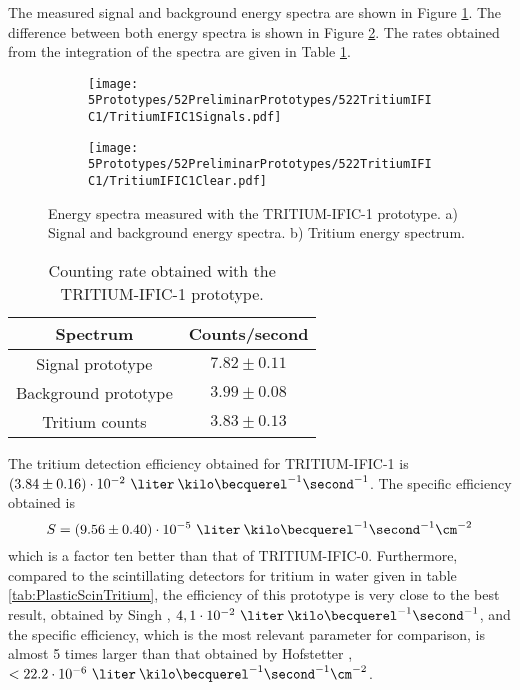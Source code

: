 The measured signal and background energy spectra are shown in Figure \ref{subfig:SignalBackgroundEnergySpectraTritiumIFIC1}. The difference between both energy spectra is shown in Figure \ref{subfig:TritiumEnergySpectraTritiumIFIC1}. The rates obtained from the integration of the spectra are given in Table \ref{tab:CountsPerSecondTRITIUMIFIC1}. 

\begin{figure}
\centering
    \begin{subfigure}[b]{1\textwidth}
    \centering
    \texttt{[image: 5Prototypes/52PreliminarPrototypes/522TritiumIFIC1/TritiumIFIC1Signals.pdf]}  
    \caption{\label{subfig:SignalBackgroundEnergySpectraTritiumIFIC1}}
    \end{subfigure}
    \hfill
    \begin{subfigure}[b]{1\textwidth}
    \centering
    \texttt{[image: 5Prototypes/52PreliminarPrototypes/522TritiumIFIC1/TritiumIFIC1Clear.pdf]}  
    \caption{\label{subfig:TritiumEnergySpectraTritiumIFIC1}}
    \end{subfigure}
 \caption{Energy spectra measured with the TRITIUM-IFIC-1 prototype. a) Signal and background energy spectra. b) Tritium energy spectrum.}
 \label{fig:EnergySpectraTRITIUMIFIC1}
\end{figure}

\begin{table}[htbp]
\centering{}%
\begin{tabular}{cc}
\toprule 
Spectrum & Counts/second \tabularnewline
\midrule
\midrule 
Signal prototype & $7.82 \pm 0.11$ \tabularnewline
Background prototype & $3.99 \pm 0.08$ \tabularnewline  
Tritium counts & $3.83 \pm 0.13$ \tabularnewline
\bottomrule
\end{tabular}
\caption{Counting rate obtained with the TRITIUM-IFIC-1 prototype.}
\label{tab:CountsPerSecondTRITIUMIFIC1}
\end{table}
The tritium detection efficiency obtained for TRITIUM-IFIC-1 is $(3.84 \pm 0.16)\cdot{} 10^{-2}~\liter\:\kilo\becquerel^{-1}\second^{-1}$. The specific efficiency obtained is
$$S=(9.56 \pm 0.40)\cdot{} 10^{-5}~\liter\:\kilo\becquerel^{-1}\second^{-1}\cm^{-2}$$
which is a factor ten better than that of TRITIUM-IFIC-0. Furthermore, compared to the scintillating detectors for tritium in water given in table \ref{tab:PlasticScinTritium}, the efficiency of this prototype is very close to the best result, obtained by Singh \cite{Ratnakaran, Ratnakaran2000}, $4,1 \cdot{} 10^{-2}~\liter\:\kilo\becquerel^{-1}\second^{-1}$, and the specific efficiency, which is the most relevant parameter for comparison, is almost 5 times larger than that obtained by Hofstetter \cite{Hofstetter1, Hofstetter2}, $<22.2 \cdot{} 10^{-6}~\liter\:\kilo\becquerel^{-1}\second^{-1}\cm^{-2}$.
